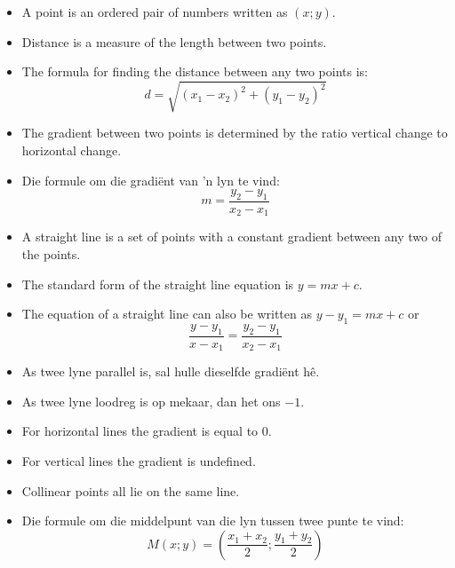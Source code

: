 \summary{}
\begin{itemize}[noitemsep]
\item A point is an ordered pair of numbers written as $(x;y)$.
\item Distance is a measure of the length between two points.
\item The formula for finding the distance between  any two points is: 
\begin{equation*}
d=\sqrt{{({x}_{1}-{x}_{2})}^{2}+{({y}_{1}-{y}_{2})}^{2}}
\end{equation*}
\item The gradient between two points is determined by the ratio vertical change to horizontal change.

\item Die formule om die gradiënt van ’n lyn te vind: 
\begin{equation*}
m=\frac{{y}_{2}-{y}_{1}}{{x}_{2}-{x}_{1}}
\end{equation*}
\item A straight line is a set of points with a constant gradient between any two of the
points.
\item The standard form of the straight line equation is $y=mx+c$.
\item The equation of a straight line can also be written as $y-y_1=mx+c$  or 
\begin{equation*}
\dfrac{y-y_1}{x-x_1}=\dfrac{y_2-y_1}{x_2-x_1}\end{equation*}
\item As twee lyne parallel is, sal hulle dieselfde gradiënt hê.
\item As twee lyne loodreg is op mekaar,
dan het ons $-1$.
\item For horizontal lines the gradient is equal to $0$.
\item For vertical lines the gradient is undefined.
\item Collinear points all lie on the same line.
\item Die formule om die middelpunt van die lyn tussen twee punte te vind: 
\begin{equation*}
M(x;y) = \left(\frac{{x}_{1}+{x}_{2}}{2};\frac{{y}_{1}+{y}_{2}}{2}\right)
\end{equation*}
\end{itemize}


